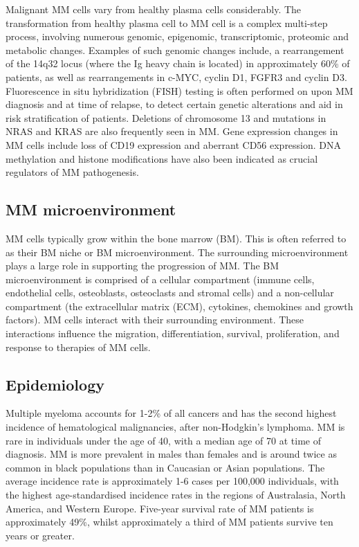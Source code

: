 Malignant MM cells vary from healthy plasma cells considerably.
The transformation from healthy plasma cell to MM cell is a complex multi-step process, involving numerous genomic, epigenomic, transcriptomic, proteomic and metabolic changes\cite{de2002comparison, caprio2020epigenetic, chanukuppa2021proteomic, el2018metabolic}.
Examples of such genomic changes include, a rearrangement of the 14q32 locus (where the Ig heavy chain is located)\cite{nishida1997ig} in approximately 60\% of patients, as well as rearrangements in c-MYC, cyclin D1, FGFR3 and cyclin D3\cite{de2002comparison}.
Fluorescence in situ hybridization (FISH) testing is often performed on upon MM diagnosis and at time of relapse, to detect certain genetic alterations and aid in risk stratification of patients\cite{swerdlow2008classification}.
Deletions of chromosome 13 and mutations in NRAS and KRAS are also frequently seen in MM\@.
Gene expression changes in MM cells include loss of CD19 expression and aberrant CD56 expression.
DNA methylation and histone modifications have also been indicated as crucial regulators of MM pathogenesis.

\subsection{MM microenvironment}
MM cells typically grow within the bone marrow (BM).
This is often referred to as their BM niche or BM microenvironment.
The surrounding microenvironment plays a large role in supporting the progression of MM.
The BM microenvironment is comprised of a cellular compartment (immune cells, endothelial cells, osteoblasts, osteoclasts and stromal cells) and a non-cellular compartment (the extracellular matrix (ECM), cytokines, chemokines and growth factors)\cite{manier2012bone, kawano2015targeting}.
MM cells interact with their surrounding environment.
These interactions influence the migration, differentiation, survival, proliferation, and response to therapies of MM cells.

\subsection{Epidemiology}
Multiple myeloma accounts for 1-2\% of all cancers and has the second highest incidence of hematological malignancies, after non-Hodgkin's lymphoma\cite{international2003criteria}.
MM is rare in individuals under the age of 40, with a median age of 70 at time of diagnosis\cite{tsang2019multiple, palumbo2011multiple}.
MM is more prevalent in males than females and is around twice as common in black populations than in Caucasian or Asian populations\cite{nhsmyeloma}.
The average incidence rate is approximately 1-6 cases per 100,000 individuals\cite{tsang2019multiple, palumbo2011multiple, teras20162016}, with the highest age-standardised incidence rates in the regions of Australasia, North America, and Western Europe\cite{cowan2018global}.
Five-year survival rate of MM patients is approximately 49\%, whilst approximately a third of MM patients survive ten years or greater\cite{cancerresearchuk, siegel2016cancer}.

